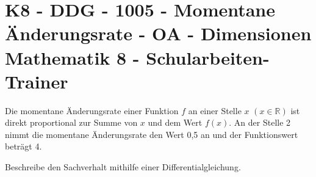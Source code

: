 \section{K8 - DDG - 1005 - Momentane Änderungsrate - OA - Dimensionen Mathematik 8 - Schularbeiten-Trainer}

\begin{beispiel}[K8 - DDG]{1}
Die momentane Änderungsrate einer Funktion $f$ an einer Stelle $x$ $(x\in\mathbb{R})$ ist direkt proportional zur Summe von $x$ und dem Wert $f(x)$. An der Stelle 2 nimmt die momentane Änderungsrate den Wert 0,5 an und der Funktionswert beträgt 4.

Beschreibe den Sachverhalt mithilfe einer Differentialgleichung.

\end{beispiel}